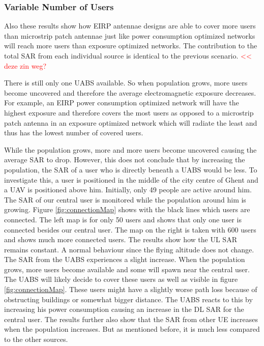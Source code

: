 \documentclass[twocolumn]{phdsymp} %
\begin{document}
\subsubsection{Variable Number of Users}

Also these results show how EIRP antennae designs are able to cover more users than microstrip patch antennae
just like power consumption optimized networks will reach more users than exposure optimized networks.
The contribution to the total \gls{SAR} from each individual source is identical to the previous scenario. \textcolor{red}{ << deze zin weg?}

There is still only one \gls{UABS} available. So when population grows, more users become uncovered and 
therefore the average electromagnetic exposure decreases.
For example, an EIRP power consumption optimized network
will have the highest exposure and therefore covers the most users as opposed to a microstrip patch antenna in 
an exposure optimized network which will radiate the least and thus has the lowest number of covered users.

While the population grows, more and more users become uncovered causing the average SAR to drop. 
However, this does not conclude that by increasing the population, the SAR of a user who is directly beneath a \gls{UABS} would be less.
To investigate this, a user is positioned in the middle of the city centre of Ghent and a \gls{UAV} is positioned above him. Initially, only 
49 people are active around him. The \gls{SAR} of our central user is monitored while the population around him is growing.
Figure \ref{fig:connectionMap} shows with the black lines which users are connected. The left map is for only 50 users and 
shows that only one user is connected besides our central user. The map on the right is taken with 600 users and shows much more connected users.
The results show how the \gls{UL} \gls{SAR} remains constant. A normal behaviour since the flying altitude does not change.
The \gls{SAR} from the \gls{UABS} experiences a slight increase. When the population grows, more users become available 
and some will spawn near the central user. The \gls{UABS} will likely decide to cover these users as well as visible in figure \ref{fig:connectionMap}.
These users might have a slightly 
worse path loss because of obstructing buildings or somewhat bigger distance. The \gls{UABS} reacts to this by increasing 
his power consumption causing an increase in the \gls{DL} \gls{SAR} for the central user. The results further also show 
that the \gls{SAR} from other \gls{UE} increases when the population increases. But as mentioned  before, it is much less 
compared to the other sources.
\end{document}
